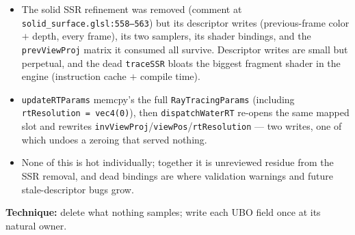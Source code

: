 \documentclass[11pt,a4paper]{article}
\begin{document}
\begin{itemize}
    \item The solid SSR refinement was removed (comment at \texttt{solid\_surface.glsl:558--563}) but its descriptor writes (previous-frame color $+$ depth, every frame), its two samplers, its shader bindings, and the \texttt{prevViewProj} matrix it consumed all survive. Descriptor writes are small but perpetual, and the dead \texttt{traceSSR} bloats the biggest fragment shader in the engine (instruction cache $+$ compile time).
    \item \texttt{updateRTParams} memcpy's the full \texttt{RayTracingParams} (including \texttt{rtResolution = vec4(0)}), then \texttt{dispatchWaterRT} re-opens the same mapped slot and rewrites \texttt{invViewProj}/\texttt{viewPos}/\texttt{rtResolution} --- two writes, one of which undoes a zeroing that served nothing.
    \item None of this is hot individually; together it is unreviewed residue from the SSR removal, and dead bindings are where validation warnings and future stale-descriptor bugs grow.
\end{itemize}

\textbf{Technique:} delete what nothing samples; write each UBO field once at its natural owner.
\end{document}
